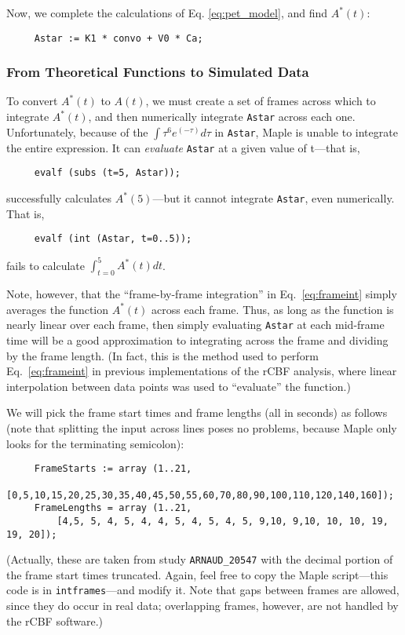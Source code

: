 Now, we complete the calculations of Eq. \ref{eq:pet_model}, and find
$A^{*}(t)$:
\begin{verbatim}
     Astar := K1 * convo + V0 * Ca;
\end{verbatim}

\subsubsection{From Theoretical Functions to Simulated Data}

To convert $A^{*}(t)$ to $A(t)$, we must create a set of frames across
which to integrate $A^{*}(t)$, and then numerically integrate
\verb|Astar| across each one.  Unfortunately, because of the $\int
\tau^{6} e^{(-\tau)} d\tau$ in \verb|Astar|, Maple is unable to integrate
the entire expression.  It can {\em evaluate} \verb|Astar| at a given
value of t---that is, 
\begin{verbatim}
     evalf (subs (t=5, Astar));
\end{verbatim}
successfully calculates $A^{*} (5)$---but it cannot integrate
\verb|Astar|, even numerically.  That is,
\begin{verbatim}
     evalf (int (Astar, t=0..5));
\end{verbatim}
fails to calculate $\int_{t=0}^{5} A^{*} (t) dt$.

Note, however, that the ``frame-by-frame integration'' in
Eq.~\ref{eq:frameint} simply averages the function $A^{*}(t)$ across
each frame.  Thus, as long as the function is nearly linear over each
frame, then simply evaluating \verb|Astar| at each mid-frame time will
be a good approximation to integrating across the frame and dividing
by the frame length.  (In fact, this is the method used to perform
Eq.~\ref{eq:frameint} in previous implementations of the rCBF
analysis, where linear interpolation between data points was used to
``evaluate'' the function.)

We will pick the frame start times and frame lengths (all in seconds)
as follows (note that splitting the input across lines poses no
problems, because Maple only looks for the terminating semicolon):
\begin{verbatim}
     FrameStarts := array (1..21, 
         [0,5,10,15,20,25,30,35,40,45,50,55,60,70,80,90,100,110,120,140,160]);
     FrameLengths = array (1..21, 
         [4,5, 5, 4, 5, 4, 4, 5, 4, 5, 4, 5, 9,10, 9,10, 10, 10, 19, 19, 20]);
\end{verbatim}
(Actually, these are taken from study \verb|ARNAUD_20547| with the
decimal portion of the frame start times truncated.  Again, feel free
to copy the Maple script---this code is in \verb|intframes|---and
modify it.  Note that gaps between frames are allowed, since they do
occur in real data; overlapping frames, however, are not handled by
the rCBF software.)

